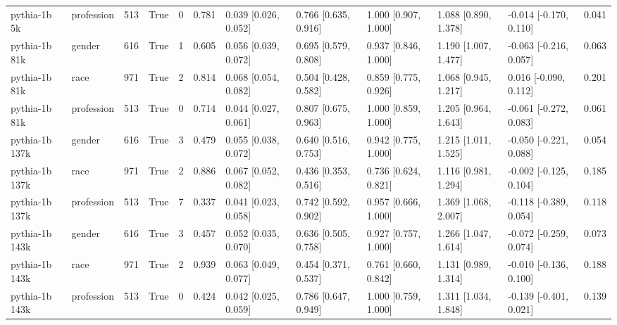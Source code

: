 \begin{tabular}{llrrrrlllllr}
pythia-1b 5k & profession & 513 & True & 0 & 0.781 & 0.039 [0.026, 0.052] & 0.766 [0.635, 0.916] & 1.000 [0.907, 1.000] & 1.088 [0.890, 1.378] & -0.014 [-0.170, 0.110] & 0.041 \\
pythia-1b 81k & gender & 616 & True & 1 & 0.605 & 0.056 [0.039, 0.072] & 0.695 [0.579, 0.808] & 0.937 [0.846, 1.000] & 1.190 [1.007, 1.477] & -0.063 [-0.216, 0.057] & 0.063 \\
pythia-1b 81k & race & 971 & True & 2 & 0.814 & 0.068 [0.054, 0.082] & 0.504 [0.428, 0.582] & 0.859 [0.775, 0.926] & 1.068 [0.945, 1.217] & 0.016 [-0.090, 0.112] & 0.201 \\
pythia-1b 81k & profession & 513 & True & 0 & 0.714 & 0.044 [0.027, 0.061] & 0.807 [0.675, 0.963] & 1.000 [0.859, 1.000] & 1.205 [0.964, 1.643] & -0.061 [-0.272, 0.083] & 0.061 \\
pythia-1b 137k & gender & 616 & True & 3 & 0.479 & 0.055 [0.038, 0.072] & 0.640 [0.516, 0.753] & 0.942 [0.775, 1.000] & 1.215 [1.011, 1.525] & -0.050 [-0.221, 0.088] & 0.054 \\
pythia-1b 137k & race & 971 & True & 2 & 0.886 & 0.067 [0.052, 0.082] & 0.436 [0.353, 0.516] & 0.736 [0.624, 0.821] & 1.116 [0.981, 1.294] & -0.002 [-0.125, 0.104] & 0.185 \\
pythia-1b 137k & profession & 513 & True & 7 & 0.337 & 0.041 [0.023, 0.058] & 0.742 [0.592, 0.902] & 0.957 [0.666, 1.000] & 1.369 [1.068, 2.007] & -0.118 [-0.389, 0.054] & 0.118 \\
pythia-1b 143k & gender & 616 & True & 3 & 0.457 & 0.052 [0.035, 0.070] & 0.636 [0.505, 0.758] & 0.927 [0.757, 1.000] & 1.266 [1.047, 1.614] & -0.072 [-0.259, 0.074] & 0.073 \\
pythia-1b 143k & race & 971 & True & 2 & 0.939 & 0.063 [0.049, 0.077] & 0.454 [0.371, 0.537] & 0.761 [0.660, 0.842] & 1.131 [0.989, 1.314] & -0.010 [-0.136, 0.100] & 0.188 \\
pythia-1b 143k & profession & 513 & True & 0 & 0.424 & 0.042 [0.025, 0.059] & 0.786 [0.647, 0.949] & 1.000 [0.759, 1.000] & 1.311 [1.034, 1.848] & -0.139 [-0.401, 0.021] & 0.139 \\
\bottomrule
\end{tabular}
